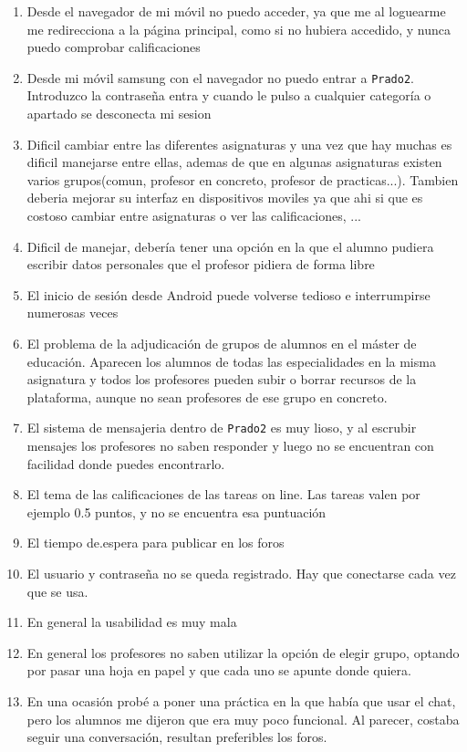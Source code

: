 \begin{enumerate}
\item Desde el navegador de mi móvil no puedo acceder, ya que me al loguearme me redirecciona a la página principal, como si no hubiera accedido, y nunca puedo comprobar calificaciones
\item Desde mi móvil samsung con el navegador no puedo entrar a \texttt{Prado2}. Introduzco la contraseña entra y cuando le pulso a cualquier categoría o apartado se desconecta mi sesion
\item Dificil cambiar entre las diferentes asignaturas y una vez que hay muchas es dificil manejarse entre ellas, ademas de que en algunas asignaturas existen varios grupos(comun, profesor en concreto, profesor de practicas...). Tambien deberia mejorar su interfaz en dispositivos moviles ya que ahi si que es costoso cambiar entre asignaturas o ver las calificaciones, ...
\item Dificil de manejar, debería tener una opción en la que el alumno pudiera escribir datos personales que el profesor pidiera de forma libre
\item El inicio de sesión desde Android puede volverse tedioso e interrumpirse numerosas veces
\item El problema de la adjudicación de grupos de alumnos en el máster de educación. Aparecen los alumnos de todas las especialidades en la misma asignatura y todos los profesores pueden subir o borrar recursos de la plataforma, aunque no sean profesores de ese grupo en concreto.
\item El sistema de mensajeria dentro de \texttt{Prado2} es muy lioso, y al escrubir mensajes los profesores no saben responder y luego no se encuentran con facilidad donde puedes encontrarlo.
\item El tema de las calificaciones de las tareas on line. Las tareas valen por ejemplo 0.5 puntos, y no se encuentra esa puntuación
\item El tiempo de.espera para publicar en los foros
\item El usuario y contraseña no se queda registrado. Hay que conectarse cada vez que se usa.
\item En general la usabilidad es muy mala
\item En general los profesores no saben utilizar la opción de elegir grupo, optando por pasar una hoja en papel y que cada uno se apunte donde quiera.
\item En una ocasión probé a poner una práctica en la que había que usar el chat, pero los alumnos me dijeron que era muy poco funcional. Al parecer, costaba seguir una conversación, resultan preferibles los foros.

\end{enumerate}
